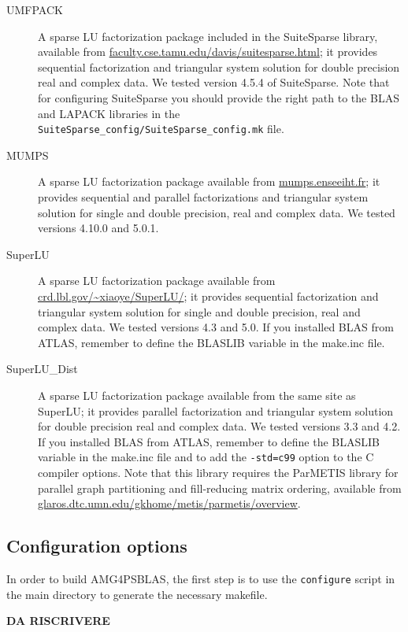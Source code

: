 \begin{description}
\item[UMFPACK] \cite{UMFPACK}
  A sparse LU factorization package included in the SuiteSparse library, available from
  \url{faculty.cse.tamu.edu/davis/suitesparse.html};
  it provides sequential factorization and triangular system solution for double
  precision real and complex data. We tested version 4.5.4 of SuiteSparse.
  Note that for configuring SuiteSparse you should provide the right path to the BLAS
  and LAPACK libraries in the \verb|SuiteSparse_config/SuiteSparse_config.mk| file.
\item[MUMPS] \cite{MUMPS}
  A sparse LU factorization package available from \url{mumps.enseeiht.fr};
  it provides sequential and parallel factorizations and triangular system solution
  for single and double precision, real and complex data.
  We tested versions 4.10.0 and 5.0.1.
\item[SuperLU] \cite{SUPERLU}
  A sparse LU factorization package available from
  \url{crd.lbl.gov/~xiaoye/SuperLU/}; it provides sequential
  factorization and triangular system solution for single and double precision,
  real and complex data. We tested versions 4.3 and 5.0. If you installed BLAS from
  ATLAS, remember to define the BLASLIB variable in the make.inc file.
 \item[SuperLU\_Dist] \cite{SUPERLUDIST}
   A sparse LU factorization package available
   from the same site as SuperLU; it provides parallel factorization and
   triangular system solution for double precision real and complex data.
   We tested versions 3.3 and 4.2. If you installed BLAS from
   ATLAS, remember to define the BLASLIB variable in the make.inc file and
   to add the \verb|-std=c99| option to the C compiler options.
   Note that this library requires the ParMETIS
   library for parallel graph partitioning and fill-reducing matrix ordering, available from
   \url{glaros.dtc.umn.edu/gkhome/metis/parmetis/overview}.
\end{description}

\subsection{Configuration options}

In order to build AMG4PSBLAS, the first step is to use the \verb|configure| script
in the main directory to generate the necessary makefile.


\textbf{DA RISCRIVERE}

